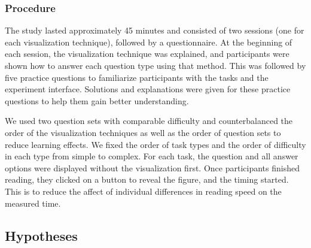 \subsubsection{Procedure} The study lasted approximately 45 minutes and consisted of two sessions (one for each visualization technique), followed by a questionnaire. At the beginning of each session, the visualization technique was explained, and participants were shown how to answer each question type using that method. This was followed by five practice questions to familiarize participants with the tasks and the experiment interface. Solutions and explanations were given for these practice questions to help them gain better understanding.

We used two question sets with comparable difficulty and counterbalanced the order of the visualization techniques as well as the order of question sets to reduce learning effects. We fixed the order of task types and the order of difficulty in each type from simple to complex. For each task, the question and all answer options were displayed without the visualization first. Once participants finished reading, they clicked on a button to reveal the figure, and the timing started. This is to reduce the affect of individual differences in reading speed on the measured time.

\subsection{Hypotheses}

